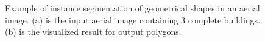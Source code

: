 \begin{figure}[!h]
	\centering
    \caption[Example of instance segmentation of geometrical shapes in an aerial image]{Example of instance segmentation of geometrical shapes in an aerial image. (a) is the input aerial image containing 3 complete buildings. (b) is the visualized result for output polygons.}
	\label{fig:defgeoseg}
\end{figure}